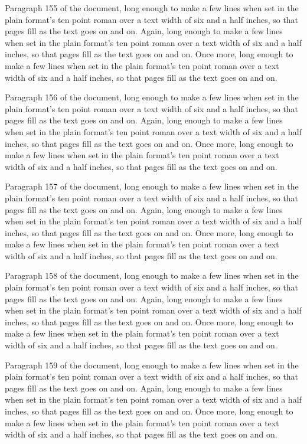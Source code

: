 Paragraph 155 of the document, long enough to make a few lines when set in the plain format's ten point roman over a text width of six and a half inches, so that pages fill as the text goes on and on. Again, long enough to make a few lines when set in the plain format's ten point roman over a text width of six and a half inches, so that pages fill as the text goes on and on. Once more, long enough to make a few lines when set in the plain format's ten point roman over a text width of six and a half inches, so that pages fill as the text goes on and on.

Paragraph 156 of the document, long enough to make a few lines when set in the plain format's ten point roman over a text width of six and a half inches, so that pages fill as the text goes on and on. Again, long enough to make a few lines when set in the plain format's ten point roman over a text width of six and a half inches, so that pages fill as the text goes on and on. Once more, long enough to make a few lines when set in the plain format's ten point roman over a text width of six and a half inches, so that pages fill as the text goes on and on.

Paragraph 157 of the document, long enough to make a few lines when set in the plain format's ten point roman over a text width of six and a half inches, so that pages fill as the text goes on and on. Again, long enough to make a few lines when set in the plain format's ten point roman over a text width of six and a half inches, so that pages fill as the text goes on and on. Once more, long enough to make a few lines when set in the plain format's ten point roman over a text width of six and a half inches, so that pages fill as the text goes on and on.

Paragraph 158 of the document, long enough to make a few lines when set in the plain format's ten point roman over a text width of six and a half inches, so that pages fill as the text goes on and on. Again, long enough to make a few lines when set in the plain format's ten point roman over a text width of six and a half inches, so that pages fill as the text goes on and on. Once more, long enough to make a few lines when set in the plain format's ten point roman over a text width of six and a half inches, so that pages fill as the text goes on and on.

Paragraph 159 of the document, long enough to make a few lines when set in the plain format's ten point roman over a text width of six and a half inches, so that pages fill as the text goes on and on. Again, long enough to make a few lines when set in the plain format's ten point roman over a text width of six and a half inches, so that pages fill as the text goes on and on. Once more, long enough to make a few lines when set in the plain format's ten point roman over a text width of six and a half inches, so that pages fill as the text goes on and on.

